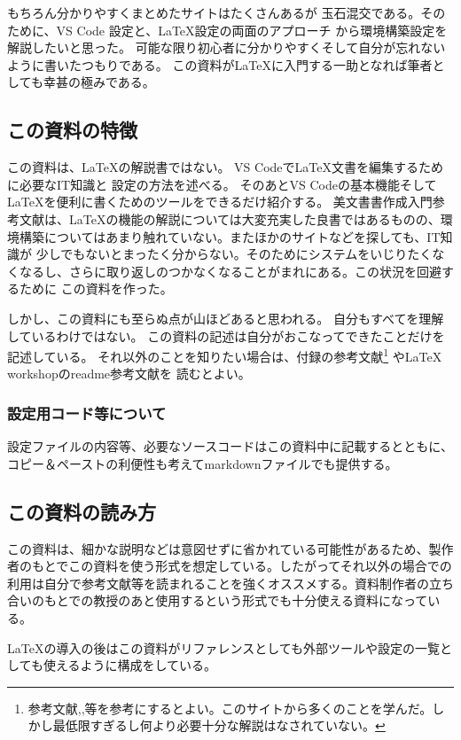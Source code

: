 \documentclass[titlepage]{ltjsarticle}
\begin{document}
もちろん分かりやすくまとめたサイトはたくさんあるが
玉石混交である。そのために、VS Code 設定と、\LaTeX 設定の両面のアプローチ
から環境構築設定を解説したいと思った。
可能な限り初心者に分かりやすくそして自分が忘れないように書いたつもりである。
この資料が\LaTeX に入門する一助となれば筆者としても幸甚の極みである。

\subsection{この資料の特徴}
この資料は、\LaTeX の解説書ではない。
VS Codeで\LaTeX 文書を編集するために必要なIT知識と
設定の方法を述べる。
そのあとVS Codeの基本機能そしてLaTeXを便利に書くためのツールをできるだけ紹介する。
美文書書作成入門参考文献\cite{美文書本}は、\LaTeX の機能の解説については大変充実した良書ではあるものの、環境構築についてはあまり触れていない。またほかのサイトなどを探しても、IT知識が
少しでもないとまったく分からない。そのためにシステムをいじりたくなくなるし、さらに取り返しのつかなくなることがまれにある。この状況を回避するために
この資料を作った。

しかし、この資料にも至らぬ点が山ほどあると思われる。
自分もすべてを理解しているわけではない。
この資料の記述は自分がおこなってできたことだけを記述している。
それ以外のことを知りたい場合は、付録の参考文献\footnote{参考文献\cite{完全導入ガイド},\cite{最高の環境latex},\cite{platex}等を参考にするとよい。このサイトから多くのことを学んだ。しかし最低限すぎるし何より必要十分な解説はなされていない。}
やLaTeX workshopのreadme参考文献\cite{LaTeXworkshop_README}を
読むとよい。

\subsubsection{設定用コード等について}
設定ファイルの内容等、必要なソースコードはこの資料中に記載するとともに、コピー＆ペーストの利便性も考えてmarkdownファイルでも提供する。


\subsection{この資料の読み方}
この資料は、細かな説明などは意図せずに省かれている可能性があるため、製作者のもとでこの資料を使う形式を想定している。したがってそれ以外の場合での利用は自分で参考文献等を読まれることを強くオススメする。資料制作者の立ち合いのもとでの教授のあと使用するという形式でも十分使える資料になっている。

\LaTeX の導入の後はこの資料がリファレンスとしても外部ツールや設定の一覧としても使えるように構成をしている。
\end{document}

